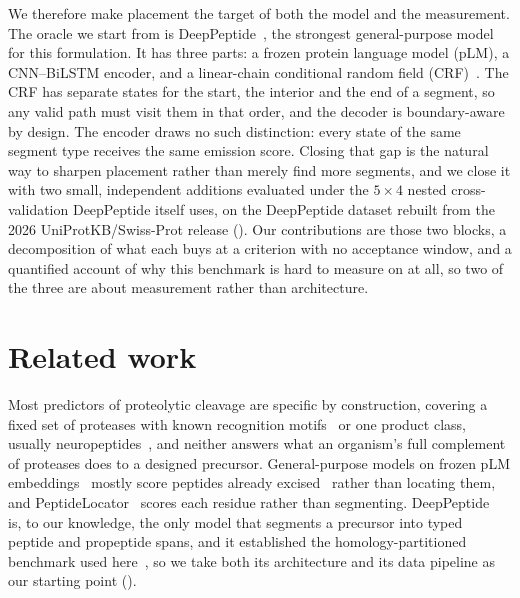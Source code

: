 \documentclass{article}
\begin{document}
We therefore make placement the target of both the model and the measurement. The oracle we start
from is DeepPeptide~\citep{deeppeptide2023}, the strongest general-purpose model for this
formulation. It has three parts: a frozen protein language model (pLM), a CNN--BiLSTM encoder, and a
linear-chain conditional random field (CRF)~\citep{lafferty2001crf}. The CRF has separate states for the start, the interior
and the end of a segment, so any valid path must visit them in that order, and the decoder is
boundary-aware by design. The encoder draws no such distinction: every state of the same
segment type receives the same emission score. Closing that gap is the natural way to sharpen
placement rather than merely find more segments, and we close it with two small, independent
additions evaluated under the $5\times4$ nested cross-validation DeepPeptide itself uses, on the
DeepPeptide dataset rebuilt from the 2026 UniProtKB/Swiss-Prot release
(). Our contributions are those two blocks, a decomposition of
what each buys at a criterion with no acceptance window, and a quantified account of why this
benchmark is hard to measure on at all, so two of the three are about measurement rather than
architecture.

\section{Related work}
\label{sec:related}

Most predictors of proteolytic cleavage are specific by construction, covering a fixed set of
proteases with known recognition motifs~\citep{duckert2004prop,song2012prosper,li2023prosperousplus,li2020deepcleave,li2020procleave}
or one product class, usually neuropeptides~\citep{southey2006neuropred,wang2024deepneuropepred},
and neither answers what an organism's full complement of proteases does to a designed precursor.
General-purpose models on frozen pLM embeddings~\citep{lin2023esm2,esm_cambrian_blog_2024} mostly
score peptides already excised~\citep{du2024plm4ace,bpfun2025} rather than locating them, and
PeptideLocator~\citep{mooney2013peptidelocator} scores each residue rather than
segmenting. DeepPeptide~\citep{deeppeptide2023} is, to our knowledge, the only model that
segments a precursor into typed peptide and propeptide spans, and it established the
homology-partitioned benchmark used here~\citep{graphpart2023}, so we take both its architecture
and its data pipeline as our starting point ().
\end{document}
